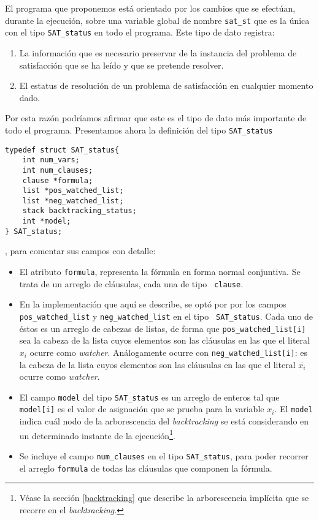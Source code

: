\documentclass[12pt,lettersize]{article}
\begin{document}
El programa que proponemos está orientado por los cambios que se efectúan,
durante la ejecución, sobre una variable global de nombre {\tt sat\_st} que es la
única con el tipo {\tt SAT\_status} en todo el programa. 
Este tipo de dato registra: \vspace{-4.5mm}
\begin{enumerate}
\item La información que es necesario preservar de la instancia del problema de
  satisfacción que se ha leído y que se pretende resolver.
\item El estatus de resolución de un problema de satisfacción en cualquier
  momento dado.
\end{enumerate}
Por esta razón podríamos afirmar que este es el tipo de dato más importante de
todo el programa.
Presentamos ahora la definición del tipo {\tt SAT\_status}
\begin{lstlisting}
typedef struct SAT_status{    
    int num_vars;
    int num_clauses;
    clause *formula;
    list *pos_watched_list;
    list *neg_watched_list;
    stack backtracking_status;
    int *model;                     
} SAT_status;
\end{lstlisting}
, para comentar sus campos con detalle:\vspace{-2.5mm}
\begin{itemize}
\item El atributo {\tt formula}, representa la fórmula en forma normal
  conjuntiva. Se trata de un arreglo de cláusulas, cada una de tipo {\tt
    clause}.
\item En la implementación que aquí se describe, se optó por por los campos {\tt
    pos\_watched\_list} y {\tt neg\_watched\_list} en el tipo {\tt
    SAT\_status}. Cada uno de éstos es un arreglo de cabezas de listas, de forma
  que {\tt pos\_watched\_list[i]} sea la cabeza de la lista cuyos elementos son
  las cláusulas en las que el literal $x_i$ ocurre como
  \emph{watcher}. Análogamente ocurre con {\tt neg\_watched\_list[i]}: es la
  cabeza de la lista cuyos elementos son las cláusulas en las que el literal
  $\overline{x_i}$ ocurre como \emph{watcher}.

\item El campo {\tt model} del tipo {\tt SAT\_status} es un arreglo de enteros
  tal que {\tt model[i]} es el valor de asignación que se prueba para la
  variable $x_i$. El {\tt model} indica cuál nodo de la arborescencia del
  \emph{backtracking} se está considerando en un determinado instante de la
  ejecución\footnote{Véase la sección \ref{backtracking} que describe la
    arborescencia implícita que se recorre en el \emph{backtracking}.}.

\item Se incluye el campo {\tt num\_clauses} en el tipo {\tt SAT\_status}, para
  poder recorrer el arreglo {\tt formula} de todas las cláusulas que componen la
  fórmula.
\end{itemize}
\end{document}
